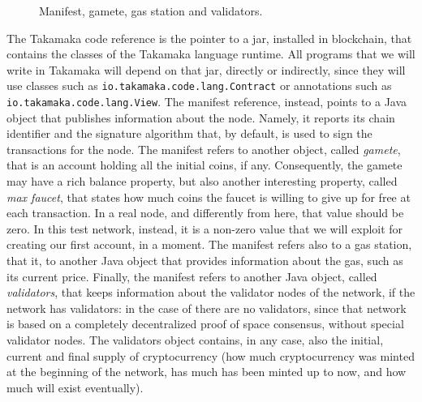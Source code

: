\begin{figure}[t]
\begin{center}
  \end{center}

  \caption{Manifest, gamete, gas station and validators.}
  \label{fig:manifest}
\end{figure}
%
The Takamaka code reference is the pointer to a jar, installed in blockchain, that contains
the classes of the Takamaka language runtime. All programs that we will write in Takamaka
will depend on that jar, directly or indirectly, since they will use classes such
as \texttt{io.takamaka.code.lang.Contract} or annotations such as
\texttt{io.takamaka.code.lang.View}.
The manifest reference, instead, points to a Java object that publishes
information about the node. Namely, it reports its chain identifier and
the signature algorithm that, by default, is used to sign the transactions
for the node. The manifest refers
to another object, called \emph{gamete}, that is an account holding all the initial
coins, if any. Consequently, the gamete may have a rich balance property,
but also another interesting property, called \emph{max faucet}, that states how much coins
the faucet
is willing to give up for free at each transaction. In a real node, and differently from here,
that value should be zero. In this test network, instead, it is a non-zero value
that we will exploit for creating our first account, in
a moment. The manifest refers also to a gas station,
that it, to another Java object that provides
information about the gas, such as its current price. Finally, the manifest refers
to another Java object, called \emph{validators}, that keeps information about
the validator nodes of the network, if the network has validators:
in the case of \serverMokamint{} there are no validators, since that network
is based on a completely decentralized proof of space consensus, without special validator nodes.
The validators object contains, in any case, also the initial,
current and final supply of cryptocurrency
(how much cryptocurrency was minted at the beginning of the network,
has much has been minted up to now, and how much will exist eventually).

